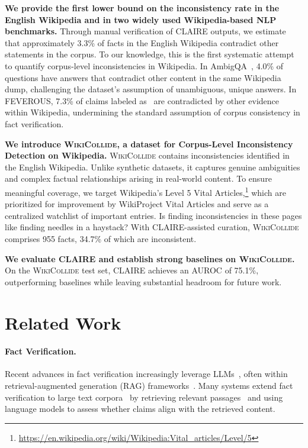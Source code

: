 \documentclass[11pt]{article}
\newcommand{\dataset}[0]{\textsc{WikiCollide}\xspace}
\newcommand{\system}[0]{\textsc{CLAIRE}\xspace}
\newcommand{\feverous}[0]{\textsc{FEVEROUS}\xspace}
\newcommand{\supports}{%
\tcbox[colback=green!10,colframe=green!50!black,boxrule=0.3pt,arc=2pt,
top=-3.5pt,bottom=-3.5pt,left=0.5pt,right=0.5pt,
nobeforeafter,tcbox raise base]{\texttt{\strut Supports}}%
}
\begin{document}
\textbf{We provide the first lower bound on the inconsistency rate in the English Wikipedia and in two widely used Wikipedia-based NLP benchmarks.} Through manual verification of \system outputs, we estimate that approximately 3.3\% of facts in the English Wikipedia contradict other statements in the corpus. To our knowledge, this is the first systematic attempt to quantify corpus-level inconsistencies in Wikipedia. In AmbigQA~\cite{min-etal-2020-ambigqa}, 4.0\% of questions have answers that contradict other content in the same Wikipedia dump, challenging the dataset's assumption of unambiguous, unique answers. In \feverous, 7.3\% of claims labeled as \supports~are contradicted by other evidence within Wikipedia, undermining the standard assumption of corpus consistency in fact verification.

\textbf{We introduce \dataset, a dataset for Corpus-Level Inconsistency Detection on Wikipedia.} \dataset contains inconsistencies identified in the English Wikipedia. Unlike synthetic datasets, it captures genuine ambiguities and complex factual relationships arising in real-world content. To ensure meaningful coverage, we target Wikipedia's Level 5 Vital Articles,\footnote{\url{https://en.wikipedia.org/wiki/Wikipedia:Vital_articles/Level/5}} which are prioritized for improvement by WikiProject Vital Articles and serve as a centralized watchlist of important entries. Is finding inconsistencies in these pages like finding needles in a haystack? With \system-assisted curation, \dataset comprises 955 facts, 34.7\% of which are inconsistent.

\textbf{We evaluate \system and establish strong baselines on \dataset.} On the \dataset test set, \system achieves an AUROC of 75.1\%, outperforming baselines while leaving substantial headroom for future work.



\section{Related Work}
\label{sec:related_work}

\paragraph{Fact Verification.}
Recent advances in fact verification increasingly leverage LLMs~\citep{luu2024zefav, jayaweera-etal-2024-amrex}, often within retrieval-augmented generation (RAG) frameworks~\citep{malviya2024evidence, rothermel-etal-2024-infact, chern2023factool, xie2024improvingmodelfactualityfinegrained}. Many systems extend fact verification to large text corpora~\citep{schuster-etal-2022-stretching} by retrieving relevant passages~\citep{khattab2020colbertefficienteffectivepassage} and using language models to assess whether claims align with the retrieved content.
\end{document}
